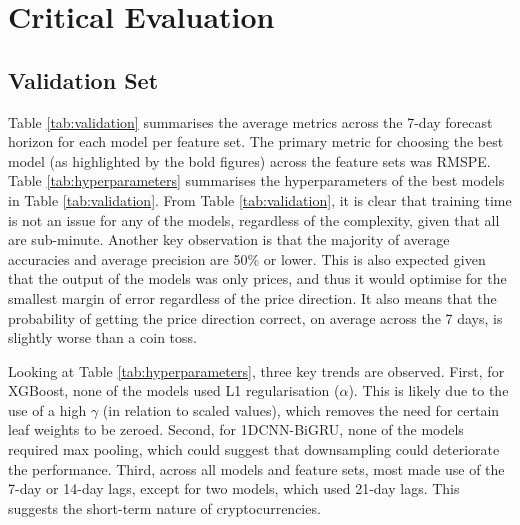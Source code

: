 \documentclass[ %
                    author={Raj Dhakan},
                supervisor={Dr. Ayush Joshi},
                    degree={MSc},
                     title={Ethereum Price Prediction using Internal and External Factors},
                  subtitle={},
                      type={},
                      year={2025}]{dissertation}
\begin{document}





\chapter{Critical Evaluation}
\label{chap:evaluation}

\section{Validation Set}
Table \ref{tab:validation} summarises the average metrics across the 7-day forecast horizon for each model per feature set. The primary metric for choosing the best model (as highlighted by the bold figures) across the feature sets was RMSPE. Table \ref{tab:hyperparameters} summarises the hyperparameters of the best models in Table \ref{tab:validation}. From Table \ref{tab:validation}, it is clear that training time is not an issue for any of the models, regardless of the complexity, given that all are sub-minute. Another key observation is that the majority of average accuracies and average precision are 50\% or lower. This is also expected given that the output of the models was only prices, and thus it would optimise for the smallest margin of error regardless of the price direction. It also means that the probability of getting the price direction correct, on average across the 7 days, is slightly worse than a coin toss.

Looking at Table \ref{tab:hyperparameters}, three key trends are observed. First, for XGBoost, none of the models used L1 regularisation ($\alpha$). This is likely due to the use of a high $\gamma$ (in relation to scaled values), which removes the need for certain leaf weights to be zeroed. Second, for 1DCNN-BiGRU, none of the models required max pooling, which could suggest that downsampling could deteriorate the performance. Third, across all models and feature sets, most made use of the 7-day or 14-day lags, except for two models, which used 21-day lags. This suggests the short-term nature of cryptocurrencies. 
\end{document}
